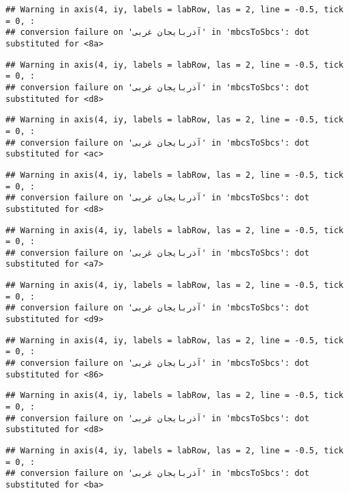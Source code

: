 \documentclass[
]{article}
\begin{document}
\begin{verbatim}
## Warning in axis(4, iy, labels = labRow, las = 2, line = -0.5, tick = 0, :
## conversion failure on 'آذربايجان غربی' in 'mbcsToSbcs': dot substituted for <8a>
\end{verbatim}

\begin{verbatim}
## Warning in axis(4, iy, labels = labRow, las = 2, line = -0.5, tick = 0, :
## conversion failure on 'آذربايجان غربی' in 'mbcsToSbcs': dot substituted for <d8>
\end{verbatim}

\begin{verbatim}
## Warning in axis(4, iy, labels = labRow, las = 2, line = -0.5, tick = 0, :
## conversion failure on 'آذربايجان غربی' in 'mbcsToSbcs': dot substituted for <ac>
\end{verbatim}

\begin{verbatim}
## Warning in axis(4, iy, labels = labRow, las = 2, line = -0.5, tick = 0, :
## conversion failure on 'آذربايجان غربی' in 'mbcsToSbcs': dot substituted for <d8>
\end{verbatim}

\begin{verbatim}
## Warning in axis(4, iy, labels = labRow, las = 2, line = -0.5, tick = 0, :
## conversion failure on 'آذربايجان غربی' in 'mbcsToSbcs': dot substituted for <a7>
\end{verbatim}

\begin{verbatim}
## Warning in axis(4, iy, labels = labRow, las = 2, line = -0.5, tick = 0, :
## conversion failure on 'آذربايجان غربی' in 'mbcsToSbcs': dot substituted for <d9>
\end{verbatim}

\begin{verbatim}
## Warning in axis(4, iy, labels = labRow, las = 2, line = -0.5, tick = 0, :
## conversion failure on 'آذربايجان غربی' in 'mbcsToSbcs': dot substituted for <86>
\end{verbatim}

\begin{verbatim}
## Warning in axis(4, iy, labels = labRow, las = 2, line = -0.5, tick = 0, :
## conversion failure on 'آذربايجان غربی' in 'mbcsToSbcs': dot substituted for <d8>
\end{verbatim}

\begin{verbatim}
## Warning in axis(4, iy, labels = labRow, las = 2, line = -0.5, tick = 0, :
## conversion failure on 'آذربايجان غربی' in 'mbcsToSbcs': dot substituted for <ba>
\end{verbatim}
\end{document}
